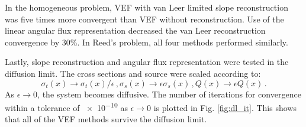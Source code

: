 In the homogeneous problem, VEF with van Leer limited slope reconstruction was five times more convergent than VEF without reconstruction. Use of the linear angular flux representation decreased the van Leer reconstruction convergence by 30\%. In Reed's problem, all four methods performed similarly. 

Lastly, slope reconstruction and angular flux representation were tested in the diffusion limit. The cross sections and source were scaled according to: 
	\begin{subequations} \label{res:scaling}
		\begin{equation} 
			\sigma_t(x) \rightarrow \sigma_t(x)/\epsilon \,, 
		\end{equation}
		\begin{equation}
			\sigma_s(x) \rightarrow \epsilon \sigma_s(x) \,,
		\end{equation}
		\begin{equation}
			Q(x) \rightarrow \epsilon Q(x) \,. 
		\end{equation}
	\end{subequations}
As $\epsilon \rightarrow 0$, the system becomes diffusive. The number of iterations for convergence within a tolerance of \num{e-10} as $\epsilon \rightarrow 0$ is plotted in Fig. \ref{fig:dl_it}. This shows that all of the VEF methods survive the diffusion limit. 
	
